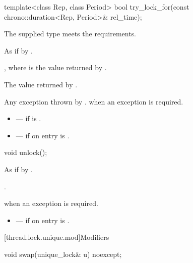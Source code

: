 %
\begin{itemdecl}
template<class Rep, class Period>
  bool try_lock_for(const chrono::duration<Rep, Period>& rel_time);
\end{itemdecl}

\begin{itemdescr}
\pnum
\expects
The supplied  type meets the  requirements.

\pnum
\effects
As if by .

\pnum
\ensures
{}, where  is the value returned by .

\pnum
\returns
The value returned by .

\pnum
\throws
Any exception thrown by .  when an
exception is required.

\pnum
\errors
\begin{itemize}
\item {} --- if  is .
\item {} --- if on entry  is
.
\end{itemize}
\end{itemdescr}

%
\begin{itemdecl}
void unlock();
\end{itemdecl}

\begin{itemdescr}
\pnum
\effects
As if by .

\pnum
\ensures
{}.

\pnum
\throws
{} when
an exception is required.

\pnum
\errors
\begin{itemize}
\item {} --- if on entry  is .
\end{itemize}
\end{itemdescr}

[thread.lock.unique.mod]{Modifiers}

%
\begin{itemdecl}
void swap(unique_lock& u) noexcept;
\end{itemdecl}

